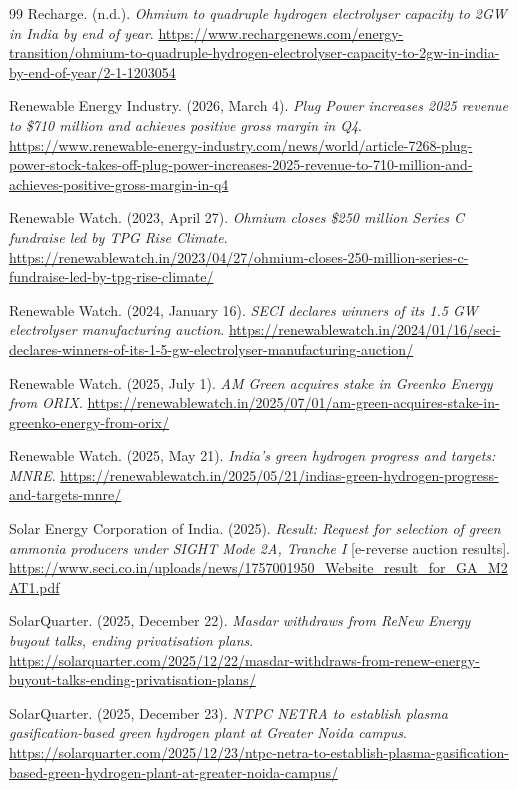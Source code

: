 {\begin{thebibliography}{99}
 Recharge. (n.d.). \emph{Ohmium to quadruple hydrogen electrolyser capacity to 2GW in India by end of year}. \url{https://www.rechargenews.com/energy-transition/ohmium-to-quadruple-hydrogen-electrolyser-capacity-to-2gw-in-india-by-end-of-year/2-1-1203054}

 Renewable Energy Industry. (2026, March 4). \emph{Plug Power increases 2025 revenue to \$710 million and achieves positive gross margin in Q4}. \url{https://www.renewable-energy-industry.com/news/world/article-7268-plug-power-stock-takes-off-plug-power-increases-2025-revenue-to-710-million-and-achieves-positive-gross-margin-in-q4}

 Renewable Watch. (2023, April 27). \emph{Ohmium closes \$250 million Series C fundraise led by TPG Rise Climate}. \url{https://renewablewatch.in/2023/04/27/ohmium-closes-250-million-series-c-fundraise-led-by-tpg-rise-climate/}

 Renewable Watch. (2024, January 16). \emph{SECI declares winners of its 1.5 GW electrolyser manufacturing auction}. \url{https://renewablewatch.in/2024/01/16/seci-declares-winners-of-its-1-5-gw-electrolyser-manufacturing-auction/}

 Renewable Watch. (2025, July 1). \emph{AM Green acquires stake in Greenko Energy from ORIX}. \url{https://renewablewatch.in/2025/07/01/am-green-acquires-stake-in-greenko-energy-from-orix/}

 Renewable Watch. (2025, May 21). \emph{India's green hydrogen progress and targets: MNRE}. \url{https://renewablewatch.in/2025/05/21/indias-green-hydrogen-progress-and-targets-mnre/}

 Solar Energy Corporation of India. (2025). \emph{Result: Request for selection of green ammonia producers under SIGHT Mode 2A, Tranche I} [e-reverse auction results]. \url{https://www.seci.co.in/uploads/news/1757001950_Website_result_for_GA_M2AT1.pdf}

 SolarQuarter. (2025, December 22). \emph{Masdar withdraws from ReNew Energy buyout talks, ending privatisation plans}. \url{https://solarquarter.com/2025/12/22/masdar-withdraws-from-renew-energy-buyout-talks-ending-privatisation-plans/}

 SolarQuarter. (2025, December 23). \emph{NTPC NETRA to establish plasma gasification-based green hydrogen plant at Greater Noida campus}. \url{https://solarquarter.com/2025/12/23/ntpc-netra-to-establish-plasma-gasification-based-green-hydrogen-plant-at-greater-noida-campus/}


\end{thebibliography}}
